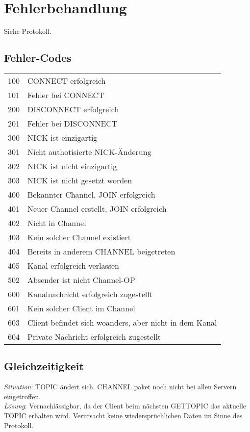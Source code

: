 \documentclass{article}
\begin{document}
\section{Fehlerbehandlung}

Siehe Protokoll.

\subsection{Fehler-Codes}

\begin{tabular}{rl}
  100 & CONNECT erfolgreich \\
  101 & Fehler bei CONNECT \\
  200 & DISCONNECT erfolgreich \\
  201 & Fehler bei DISCONNECT \\
  300 & NICK ist einzigartig \\
  301 & Nicht authotisierte NICK-Änderung \\
  302 & NICK ist nicht einzigartig \\
  303 & NICK ist nicht gesetzt worden \\
  400 & Bekannter Channel, JOIN erfolgreich \\
  401 & Neuer Channel erstellt, JOIN erfolgreich \\
  402 & Nicht in Channel \\
  403 & Kein solcher Channel existiert \\
  404 & Bereits in anderem CHANNEL beigetreten \\
  405 & Kanal erfolgreich verlassen \\
  502 & Absender ist nicht Channel-OP \\
  600 & Kanalnachricht erfolgreich zugestellt \\
  601 & Kein solcher Client im Channel \\
  603 & Client befindet sich woanders, aber nicht in dem Kanal \\
  604 & Private Nachricht erfolgreich zugestellt \\
\end{tabular}

\subsection{Gleichzeitigkeit}

\emph{Situation}: TOPIC ändert sich. CHANNEL paket noch nicht bei allen Servern eingetroffen.\\
\emph{Lösung}: Vernachlässigbar, da der Client beim nächsten GETTOPIC das aktuelle TOPIC erhalten wird. Verursacht keine wiedersprüchlichen Daten im Sinne des Protokoll.\\
\end{document}

